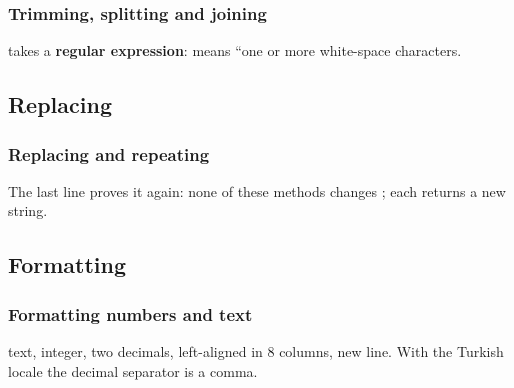 \documentclass[aspectratio=169,10pt,compress]{beamer}
\begin{document}
\begin{frame}[t,fragile] \frametitle{Trimming, splitting and joining}

  \vspace{0.3em}
  \small {} takes a \textbf{regular expression}:  means ``one or more white-space characters.
\end{frame}

\subsection[Replace]{Replacing}




\begin{frame}[t,fragile] \frametitle{Replacing and repeating}

  \vspace{0.3em}
  \small The last line proves it again: none of these methods changes ; each returns a new string.
\end{frame}

\subsection[Format]{Formatting}




\begin{frame}[t,fragile] \frametitle{Formatting numbers and text}

  \vspace{0.3em}
  \small {} text,  integer,  two decimals,  left-aligned in 8 columns,  new line.
  With the Turkish locale the decimal separator is a comma.
\end{frame}
\end{document}
